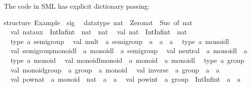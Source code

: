 \begin{isabellebody}
\begin{isamarkuptext}
\begin{typewriter}
  \end{typewriter}%
\end{isamarkuptext}%
\isamarkuptrue%
%
\endisatagquote
{\isafoldquote}%
%
\isadelimquote
%
\endisadelimquote
%
\begin{isamarkuptext}%
\noindent The code in SML has explicit dictionary passing:%
\end{isamarkuptext}%
\isamarkuptrue%
%
\isadelimquote
%
\endisadelimquote
%
\isatagquote
%
\begin{isamarkuptext}%
\begin{typewriter}
    structure\ Example\ {\isacharcolon}\ sig\isanewline
\ \ datatype\ nat\ {\isacharequal}\ Zero{\isacharunderscore}nat\ {\isacharbar}\ Suc\ of\ nat\isanewline
\ \ val\ nat{\isacharunderscore}aux\ {\isacharcolon}\ IntInf{\isachardot}int\ {\isacharminus}{\isachargreater}\ nat\ {\isacharminus}{\isachargreater}\ nat\isanewline
\ \ val\ nat\ {\isacharcolon}\ IntInf{\isachardot}int\ {\isacharminus}{\isachargreater}\ nat\isanewline
\ \ type\ {\isacharprime}a\ semigroup\isanewline
\ \ val\ mult\ {\isacharcolon}\ {\isacharprime}a\ semigroup\ {\isacharminus}{\isachargreater}\ {\isacharprime}a\ {\isacharminus}{\isachargreater}\ {\isacharprime}a\ {\isacharminus}{\isachargreater}\ {\isacharprime}a\isanewline
\ \ type\ {\isacharprime}a\ monoidl\isanewline
\ \ val\ semigroup{\isacharunderscore}monoidl\ {\isacharcolon}\ {\isacharprime}a\ monoidl\ {\isacharminus}{\isachargreater}\ {\isacharprime}a\ semigroup\isanewline
\ \ val\ neutral\ {\isacharcolon}\ {\isacharprime}a\ monoidl\ {\isacharminus}{\isachargreater}\ {\isacharprime}a\isanewline
\ \ type\ {\isacharprime}a\ monoid\isanewline
\ \ val\ monoidl{\isacharunderscore}monoid\ {\isacharcolon}\ {\isacharprime}a\ monoid\ {\isacharminus}{\isachargreater}\ {\isacharprime}a\ monoidl\isanewline
\ \ type\ {\isacharprime}a\ group\isanewline
\ \ val\ monoid{\isacharunderscore}group\ {\isacharcolon}\ {\isacharprime}a\ group\ {\isacharminus}{\isachargreater}\ {\isacharprime}a\ monoid\isanewline
\ \ val\ inverse\ {\isacharcolon}\ {\isacharprime}a\ group\ {\isacharminus}{\isachargreater}\ {\isacharprime}a\ {\isacharminus}{\isachargreater}\ {\isacharprime}a\isanewline
\ \ val\ pow{\isacharunderscore}nat\ {\isacharcolon}\ {\isacharprime}a\ monoid\ {\isacharminus}{\isachargreater}\ nat\ {\isacharminus}{\isachargreater}\ {\isacharprime}a\ {\isacharminus}{\isachargreater}\ {\isacharprime}a\isanewline
\ \ val\ pow{\isacharunderscore}int\ {\isacharcolon}\ {\isacharprime}a\ group\ {\isacharminus}{\isachargreater}\ IntInf{\isachardot}int\ {\isacharminus}{\isachargreater}\ {\isacharprime}a\ {\isacharminus}{\isachargreater}\ {\isacharprime}a\isanewline

\end{typewriter}
\end{isamarkuptext}
\end{isabellebody}
